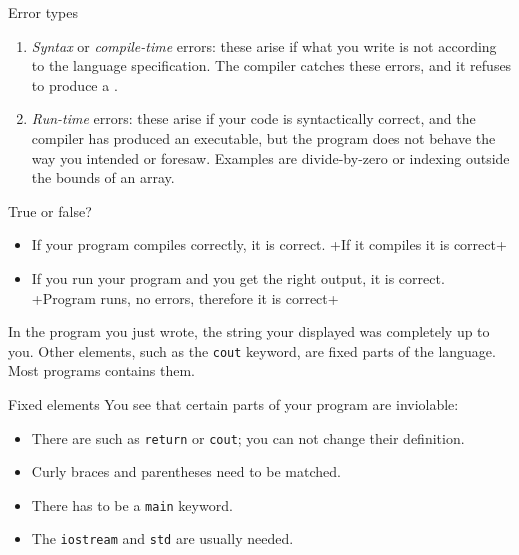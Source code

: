 \begin{block}{Error types}
  \label{sl:program-errors}
  \begin{enumerate}
  \item \emph{Syntax} or
    \emph{compile-time} errors: these arise
    if what you write is not according to the language specification.
    The compiler catches these errors, and it refuses to produce a
    .
  \item \emph{Run-time} errors: these arise if
    your code is syntactically correct, and the compiler has produced
    an executable, but the program does not behave the way you
    intended or foresaw. Examples are divide-by-zero or indexing
    outside the bounds of an array.
  \end{enumerate}
\end{block}

\begin{review}
  \label{q:compile}
  True or false?
  \begin{itemize}
  \item If your program compiles correctly, it is correct.
    \slackpollTF+If it compiles it is correct+
  \item If you run your program and you get the right output, it is correct.
    \slackpollTF+Program runs, no errors, therefore it is correct+
  \end{itemize}  
\end{review}

In the program you just wrote, the string your displayed
was completely up to you. Other elements, such as the \lstinline{cout}
keyword, are fixed parts of the language.
Most programs contains them.

\begin{block}{Fixed elements}
  \label{sl:fixedstuff}
  You see that certain parts of your program are inviolable:
  \begin{itemize}
  \item There are  such as \lstinline{return} or \lstinline{cout}; you
    can not change their definition.
  \item Curly braces and parentheses need to be matched.
  \item There has to be a \lstinline{main} keyword.
  \item The \lstinline{iostream} and \lstinline{std} are usually needed.
  \end{itemize}
\end{block}

